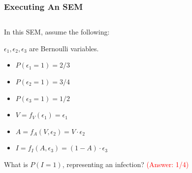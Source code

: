 \documentclass[12pt, block=fill]{beamer}
\newcommand{\paul}[1]{\textcolor{red}{#1}}
\begin{document}
\begin{frame}
  \frametitle{Executing An SEM}
  
  \begin{columns}
    \begin{column}{0.6\textwidth}
      
      In this SEM, assume the following:
      
      $\epsilon_1, \epsilon_2, \epsilon_3$ are Bernoulli variables.
      \begin{itemize}
      \item $P(\epsilon_1 = 1) = 2/3$
      \item $P(\epsilon_2 = 1) = 3/4$ 
      \item $P(\epsilon_3 = 1) = 1/2$
        
      \item $V = f_V(\epsilon_1) = \epsilon_1$
      \item $A = f_A(V, \epsilon_2) = V \cdot \epsilon_2$
      \item $I = f_I(A, \epsilon_3) = (1-A) \cdot \epsilon_3$ 
      \end{itemize}
      What is $P(I=1)$, representing an infection?
      \paul{(Answer: 1/4)}
      

\end{column}
\end{columns}
\end{frame}
\end{document}
